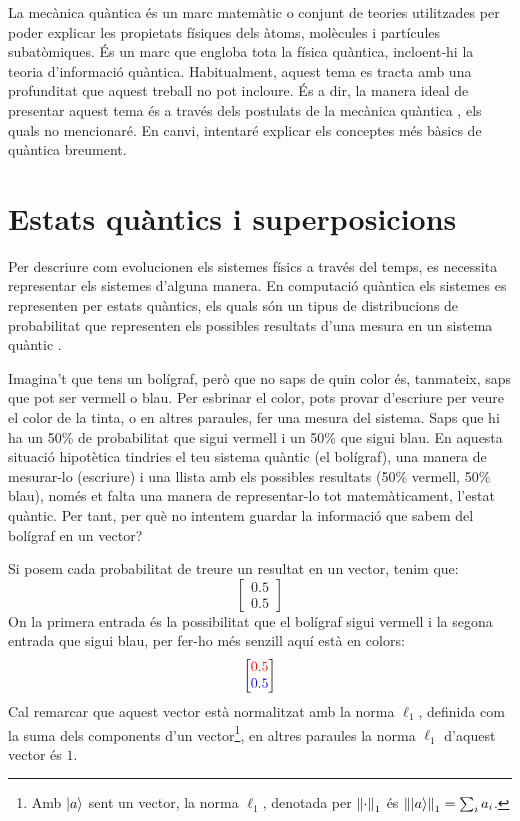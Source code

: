 La mecànica quàntica és un marc matemàtic o conjunt de teories utilitzades per poder explicar les propietats físiques dels àtoms, molècules i partícules subatòmiques. És un marc que engloba tota la física quàntica, incloent-hi la teoria d'informació quàntica. Habitualment, aquest tema es tracta amb una profunditat que aquest treball no pot incloure. És a dir, la manera ideal de presentar aquest tema és a través dels postulats de la mecànica quàntica \cite{QCandQI:QM_postulates}, els quals no mencionaré. En canvi, intentaré explicar els conceptes més bàsics de quàntica breument.

\section{Estats quàntics i superposicions}
Per descriure com evolucionen els sistemes físics a través del temps, es necessita representar els sistemes d'alguna manera. En computació quàntica els sistemes es representen per estats quàntics, els quals són un tipus de distribucions de probabilitat que representen els possibles resultats d'una mesura en un sistema quàntic \cite{QT_concepts:q_systems}.

Imagina't que tens un bolígraf, però que no saps de quin color és, tanmateix, saps que pot ser vermell o blau. Per esbrinar el color, pots provar d'escriure per veure el color de la tinta, o en altres paraules, fer una mesura del sistema. Saps que hi ha un 50\% de probabilitat que sigui vermell i un 50\% que sigui blau. En aquesta situació hipotètica tindries el teu sistema quàntic (el bolígraf), una manera de mesurar-lo (escriure) i una llista amb els possibles resultats (50\% vermell, 50\% blau), només et falta una manera de representar-lo tot matemàticament, l'estat quàntic. Per tant, per què no intentem guardar la informació que sabem del bolígraf en un vector?

Si posem cada probabilitat de treure un resultat en un vector, tenim que:
$$
\begin{bmatrix}
	0.5 \\
	0.5
\end{bmatrix}
$$
On la primera entrada és la possibilitat que el bolígraf sigui vermell i la segona entrada que sigui blau, per fer-ho més senzill aquí està en colors:
$$
\begin{bmatrix}
	\textcolor{red}{0.5} \\
	\textcolor{blue}{0.5}
\end{bmatrix}
$$
Cal remarcar que aquest vector està normalitzat amb la norma $\ell_1$, definida com la suma dels components d'un vector\footnote{Amb $\ket{a}$ sent un vector, la norma $\ell_1$, denotada per $\norm{\cdot}_1$ és $\norm{\ket{a}}_1 = \sum_i a_i$.}, en altres paraules la norma $\ell_1$ d'aquest vector és $1$.

